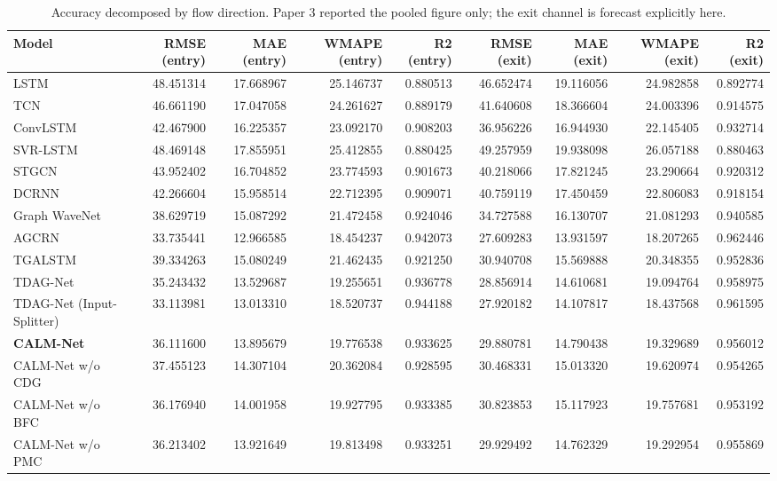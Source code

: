 \begin{table}[!t]
\caption{Accuracy decomposed by flow direction. Paper 3 reported the pooled figure only; the exit channel is forecast explicitly here.}
\label{tab:per_channel}
\centering
\footnotesize
\begin{tabular}{lrrrrrrrr}
\toprule
Model & RMSE (entry) & MAE (entry) & WMAPE (entry) & R2 (entry) & RMSE (exit) & MAE (exit) & WMAPE (exit) & R2 (exit) \\
\midrule
LSTM & 48.451314 & 17.668967 & 25.146737 & 0.880513 & 46.652474 & 19.116056 & 24.982858 & 0.892774 \\
TCN & 46.661190 & 17.047058 & 24.261627 & 0.889179 & 41.640608 & 18.366604 & 24.003396 & 0.914575 \\
ConvLSTM & 42.467900 & 16.225357 & 23.092170 & 0.908203 & 36.956226 & 16.944930 & 22.145405 & 0.932714 \\
SVR-LSTM & 48.469148 & 17.855951 & 25.412855 & 0.880425 & 49.257959 & 19.938098 & 26.057188 & 0.880463 \\
STGCN & 43.952402 & 16.704852 & 23.774593 & 0.901673 & 40.218066 & 17.821245 & 23.290664 & 0.920312 \\
DCRNN & 42.266604 & 15.958514 & 22.712395 & 0.909071 & 40.759119 & 17.450459 & 22.806083 & 0.918154 \\
Graph WaveNet & 38.629719 & 15.087292 & 21.472458 & 0.924046 & 34.727588 & 16.130707 & 21.081293 & 0.940585 \\
AGCRN & 33.735441 & 12.966585 & 18.454237 & 0.942073 & 27.609283 & 13.931597 & 18.207265 & 0.962446 \\
TGALSTM & 39.334263 & 15.080249 & 21.462435 & 0.921250 & 30.940708 & 15.569888 & 20.348355 & 0.952836 \\
TDAG-Net & 35.243432 & 13.529687 & 19.255651 & 0.936778 & 28.856914 & 14.610681 & 19.094764 & 0.958975 \\
TDAG-Net (Input-Splitter) & 33.113981 & 13.013310 & 18.520737 & 0.944188 & 27.920182 & 14.107817 & 18.437568 & 0.961595 \\
\textbf{CALM-Net} & 36.111600 & 13.895679 & 19.776538 & 0.933625 & 29.880781 & 14.790438 & 19.329689 & 0.956012 \\
CALM-Net w/o CDG & 37.455123 & 14.307104 & 20.362084 & 0.928595 & 30.468331 & 15.013320 & 19.620974 & 0.954265 \\
CALM-Net w/o BFC & 36.176940 & 14.001958 & 19.927795 & 0.933385 & 30.823853 & 15.117923 & 19.757681 & 0.953192 \\
CALM-Net w/o PMC & 36.213402 & 13.921649 & 19.813498 & 0.933251 & 29.929492 & 14.762329 & 19.292954 & 0.955869 \\

\end{tabular}
\end{table}
